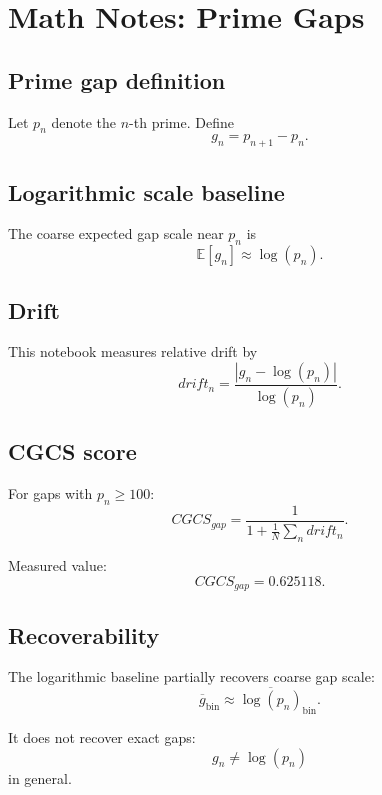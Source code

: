 \documentclass{article}
\begin{document}
\section*{Math Notes: Prime Gaps}

\subsection*{Prime gap definition}

Let $p_n$ denote the $n$-th prime. Define
\[
g_n = p_{n+1} - p_n.
\]

\subsection*{Logarithmic scale baseline}

The coarse expected gap scale near $p_n$ is
\[
\mathbb{E}[g_n] \approx \log(p_n).
\]

\subsection*{Drift}

This notebook measures relative drift by
\[
drift_n =
\frac{|g_n - \log(p_n)|}{\log(p_n)}.
\]

\subsection*{CGCS score}

For gaps with $p_n \ge 100$:
\[
CGCS_{gap} =
\frac{1}{1 + \frac{1}{N}\sum_n drift_n}.
\]

Measured value:
\[
CGCS_{gap} = 0.625118.
\]

\subsection*{Recoverability}

The logarithmic baseline partially recovers coarse gap scale:
\[
\overline{g}_{\mathrm{bin}} \approx \overline{\log(p_n)}_{\mathrm{bin}}.
\]

It does not recover exact gaps:
\[
g_n \ne \log(p_n)
\]
in general.
\end{document}
